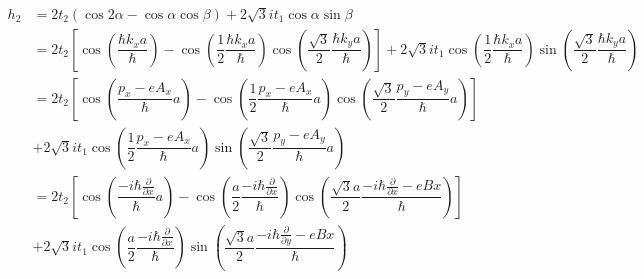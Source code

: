 \documentclass{report}
\newcommand{\f}[2]{\dfrac{#1}{#2}}
\begin{document}
\begin{align*}
	h_{2}
	 & = 2t_{2} \left(\cos2\alpha - \cos\alpha \cos\beta\right) + 2\sqrt{3} i t_{1}\cos\alpha \sin\beta                                                                                                                                                                                                                                                                                                                                                 \\
	 & = 2t_{2} \left[ \cos\left( \f{\hbar k_x a}{\hbar}\right) - \cos\left( \f{1}{2}\f{\hbar k_x a}{\hbar}  \right) \cos\left(\f{\sqrt{3}}{2}\f{\hbar k_y a}{\hbar}\right)  \right] + 2\sqrt{3} i t_{1} \cos\left(\f{1}{2}\f{\hbar k_x a}{\hbar}\right)\sin\left(\f{\sqrt{3}}{2}\f{\hbar k_y a}{\hbar}\right)                                                                                                                                          \\
	 & = 2t_{2} \left[ \cos\left(\f{p_x - eA_x}{\hbar}a\right) - \cos\left( \f{1}{2}\f{p_x - eA_x}{\hbar}a  \right) \cos\left(\f{\sqrt{3}}{2}\f{p_y - eA_y}{\hbar}a\right)  \right]                                                                                                                                                                                                                                                                     \\
	 & + 2\sqrt{3} i t_{1} \cos\left(\f{1}{2}\f{p_x -  eA_x}{\hbar}a\right)\sin\left(\f{\sqrt{3}}{2}\f{p_y - eA_y}{\hbar}a\right)                                                                                                                                                                                                                                                                                                                       \\
	 & = 2t_{2} \left[ \cos\left(\f{-i\hbar \frac{\partial}{\partial x}}{\hbar}a\right) - \cos\left( \f{a}{2}\f{-i\hbar \frac{\partial}{\partial x}}{\hbar}\right) \cos\left(\f{\sqrt{3}a}{2}\f{-i\hbar \frac{\partial}{\partial x} - eBx}{\hbar}\right)  \right]                                                                                                                                                                                       \\
	 & + 2\sqrt{3} i t_{1} \cos\left(\f{a}{2}\f{-i\hbar \frac{\partial}{\partial x}}{\hbar}\right)\sin\left(\f{\sqrt{3}a}{2}\f{-i\hbar \frac{\partial}{\partial y} - eBx}{\hbar}\right)                                                                                                                                                                                                                                                                 \\

\end{align*}
\end{document}
